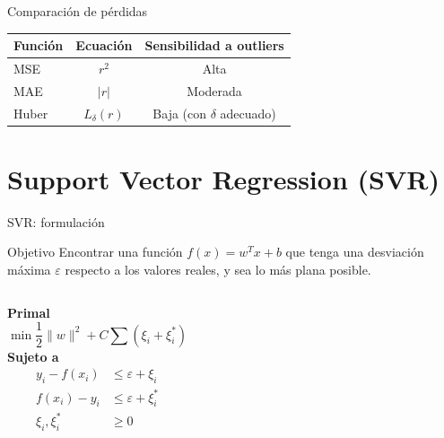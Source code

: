 \documentclass[aspectratio=169, 10pt, xcolor=table]{beamer}
\begin{document}
\begin{frame}{Comparación de pérdidas}
    \begin{table}
        \centering
        \begin{tabular}{l|c|c}
            \toprule
            \textbf{Función} & \textbf{Ecuación} & \textbf{Sensibilidad a outliers} \\
            \midrule
            MSE & $r^2$ & Alta \\
            MAE & $|r|$ & Moderada \\
            Huber & $L_{\delta}(r)$ & Baja (con $\delta$ adecuado) \\
            \bottomrule
        \end{tabular}
    \end{table}
\end{frame}

\section{Support Vector Regression (SVR)}

\begin{frame}{SVR: formulación}
    \begin{block}{Objetivo}
        Encontrar una función $f(x) = w^T x + b$ que tenga una desviación máxima $\varepsilon$ respecto a los valores reales, y sea lo más plana posible.
    \end{block}
    \begin{columns}[t]
        \textbf{Primal}
        \[
        \min \frac{1}{2}\|w\|^2 + C\sum (\xi_i + \xi_i^*)
        \]
        \textbf{Sujeto a}
        \begin{align*}
            y_i - f(x_i) &\le \varepsilon + \xi_i \\
            f(x_i) - y_i &\le \varepsilon + \xi_i^* \\
            \xi_i, \xi_i^* &\ge 0
        \end{align*}
    \end{columns}
\end{frame}
\end{document}

